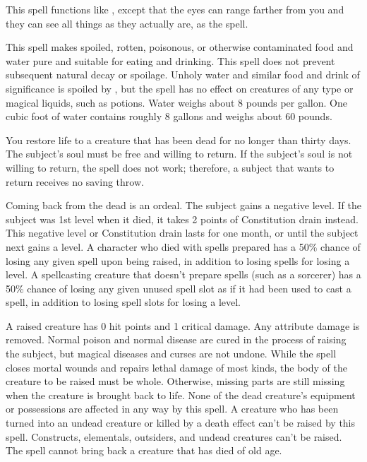 \spelleffect This spell functions like , except that the eyes can range farther from you and they can see all things as they actually are, as the  spell.

\spelleffect This spell makes spoiled, rotten, poisonous, or otherwise contaminated food and water pure and suitable for eating and drinking. This spell does not prevent subsequent natural decay or spoilage. Unholy water and similar food and drink of significance is spoiled by , but the spell has no effect on creatures of any type or magical liquids, such as potions.
\spellnotes Water weighs about 8 pounds per gallon. One cubic foot of water contains roughly 8 gallons and weighs about 60 pounds.

\spelleffect You restore life to a creature that has been dead for no longer than thirty days. The subject's soul must be free and willing to return. If the subject's soul is not willing to return, the spell does not work; therefore, a subject that wants to return receives no saving throw.
\par Coming back from the dead is an ordeal. The subject gains a negative level. If the subject was 1st level when it died, it takes 2 points of Constitution drain instead. This negative level or Constitution drain lasts for one month, or until the subject next gains a level. A character who died with spells prepared has a 50\% chance of losing any given spell upon being raised, in addition to losing spells for losing a level. A spellcasting creature that doesn't prepare spells (such as a sorcerer) has a 50\% chance of losing any given unused spell slot as if it had been used to cast a spell, in addition to losing spell slots for losing a level.
\par A raised creature has 0 hit points and 1 critical damage. Any attribute damage is removed. Normal poison and normal disease are cured in the process of raising the subject, but magical diseases and curses are not undone. While the spell closes mortal wounds and repairs lethal damage of most kinds, the body of the creature to be raised must be whole. Otherwise, missing parts are still missing when the creature is brought back to life. None of the dead creature's equipment or possessions are affected in any way by this spell.
\spellnotes A creature who has been turned into an undead creature or killed by a death effect can't be raised by this spell. Constructs, elementals, outsiders, and undead creatures can't be raised. The spell cannot bring back a creature that has died of old age.

